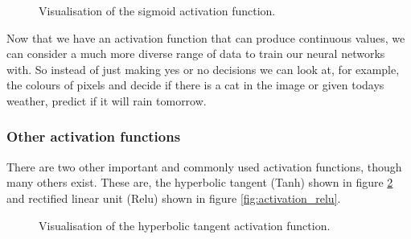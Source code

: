 \begin{figure}
\begin{center}
\caption{Visualisation of the sigmoid activation function.}
\label{fig:activation_sigmoid}
\end{center}
\end{figure}

Now that we have an activation function that can produce continuous values, we can consider a much more diverse range of data to train our neural networks with. So instead of just making yes or no decisions we can look at, for example, the colours of pixels and decide if there is a cat in the image or given todays weather, predict if it will rain tomorrow.

\subsubsection{Other activation functions}
There are two other important and commonly used activation functions, though many others exist. These are, the hyperbolic tangent (Tanh) shown in figure \ref{fig:activation_tanh} and rectified linear unit (Relu)  shown in figure \ref{fig:activation_relu}.

\begin{figure}[h]
\begin{center}
\caption{Visualisation of the hyperbolic tangent activation function.}
\label{fig:activation_tanh}
\end{center}
\end{figure}


